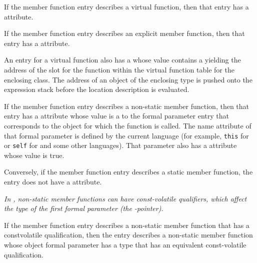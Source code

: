 If the member function entry describes a virtual function,
then that entry has a
\hyperlink{chap:DWATvirtualityvirtualityindication}{\DWATvirtualityNAME}
attribute.

If\hypertarget{chap:DWATexplicitexplicitpropertyofmemberfunction}{}
the member function entry describes an explicit member
function, then that entry has a
\DWATexplicitDEFN{} attribute.

An\hypertarget{chap:DWATvtableelemlocationvirtualfunctiontablevtableslot}{}
entry for a virtual function also has a
\DWATvtableelemlocationDEFN{}
 whose value contains
a 
yielding the address of the slot
for the function within the virtual function table for the
enclosing class. The address of an object of the enclosing
type is pushed onto the expression stack before the location
description is evaluated.

If\hypertarget{chap:DWATobjectpointerobjectthisselfpointerofmemberfunction}{}
the member function entry describes a non-static member
function, then that entry
has
a \DWATobjectpointerDEFN{} attribute
whose value is a 
to the formal parameter entry
that corresponds to the object for which the function is
called. The name attribute of that formal parameter is defined
by the current language (for example,
\texttt{this} for  or \texttt{self}
for 
and some other languages). That parameter
also has a \DWATartificial{} attribute whose value is true.

Conversely, if the member function entry describes a static
member function, the entry does not have a
\DWATobjectpointer{} attribute.

\textit{In , non-static member functions can have const-volatile
qualifiers, which affect the type of the first formal parameter (the
-pointer).}

If the member function entry describes a non-static member
function that has a const\dash volatile qualification, then
the entry describes a non-static member function whose
object formal parameter has a type that has an equivalent
const-volatile qualification.

